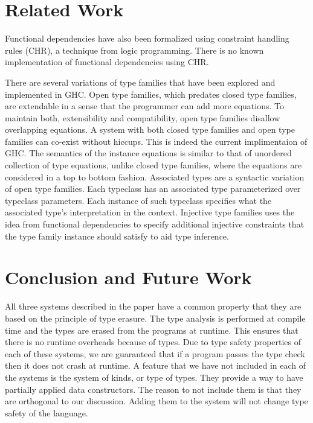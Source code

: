 \documentclass[format=sigplan,manuscript,review,screen,nonacm,margin=1in]{acmart}
\begin{document}
\section{Related Work}\label{sec:related-work}
Functional dependencies have also been formalized using constraint handling rules (CHR),
a technique from logic programming\cite{sulzmann_understanding_2007}. There is no known
implementation of functional dependencies using CHR.

There are several variations of type families that have been explored and implemented in GHC.
Open type families\cite{schrijvers_type_2008}, which predates closed type families,
are extendable in a sense that the programmer can add more equations.
To maintain both, extensibility and compatibility, open type families disallow overlapping equations.
A system with both closed type families and open type families can co-exist without hiccups. This is
indeed the current implimentaion of GHC. The semantics of the instance equations is similar to
that of unordered collection of type equations, unlike
closed type families, where the equations are considered in a top to bottom fashion.
Associated types\cite{chakravarty_associated_2005} are a syntactic variation of open type families.
Each typeclass has an associated type parameterized over typeclass parameters. Each instance of such typeclass
specifies what the associated type's interpretation in the context. Injective type families\cite{stolarek_injective_2015}
uses the idea from functional dependencies to specify additional injective constraints that the type family instance
should satisfy to aid type inference.

\section{Conclusion and Future Work}\label{sec:conclusion}
All three systems described in the paper have a common property that they are based on
the principle of type erasure. The type analysis is performed at compile time and
the types are erased from the programs at runtime.
This ensures that there is no runtime overheads because of types.
Due to type safety properties of each of these systems, we are guaranteed
that if a program passes the type check then it does not crash at runtime.
A feature that we have not included in each of the systems is the system of kinds, or type of types.
They provide a way to have partially applied data constructors. The reason to not include them is that
they are orthogonal to our discussion. Adding them to the system will not change type safety of the language.
\end{document}
